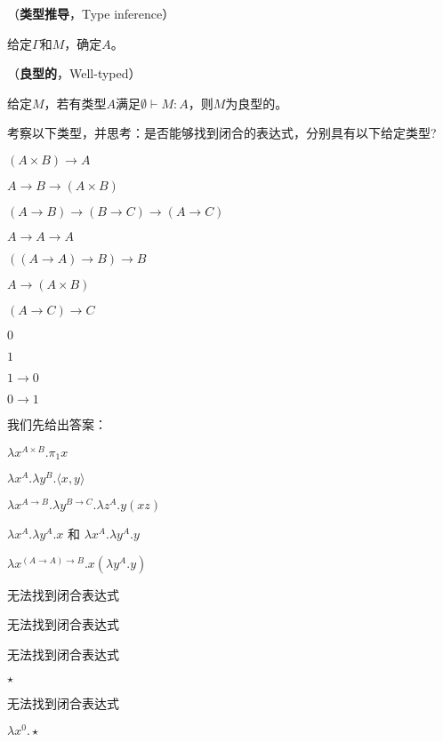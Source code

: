 \begin{defn}（\textbf{类型推导}，Type inference）

给定$\Gamma$和$M$，确定$A$。

\end{defn}

\begin{defn}（\textbf{良型的}，Well-typed）

给定$M$，若有类型$A$满足$\emptyset \vdash M : A$，则$M$为良型的。

\end{defn}

\begin{exmp}
考察以下类型，并思考：是否能够找到闭合的表达式，分别具有以下给定类型?

\begin{tightenum}

  \item $( A \times B) \to A$
  \item $A \to B \to (A \times B)$
  \item $(A \to B) \to (B \to C) \to (A \to C)$
  \item $A \to A \to A$
  \item $((A \to A) \to B) \to B$
  \item $A \to (A \times B)$
  \item $(A \to C) \to C$
  \item $0$
  \item $1$
  \item $1 \to 0$
  \item $0 \to 1$
\end{tightenum}

我们先给出答案：
\begin{tightenum}
  \item $\lambda x^{A \times B}.\pi_1 x$
  \item $\lambda x^A . \lambda y^B . \langle x, y \rangle$
  \item $\lambda x^{A \to B}. \lambda y^{B \to C} . \lambda z^A . y(xz)$
  \item $\lambda x^A . \lambda y^A . x$ 和 $\lambda x^A . \lambda y^A . y$
  \item $\lambda x^{(A \to A) \to B} . x(\lambda y^A . y)$
  \item 无法找到闭合表达式
  \item 无法找到闭合表达式
  \item 无法找到闭合表达式
  \item $\star$
  \item 无法找到闭合表达式
  \item $\lambda x^{0}. \star$
\end{tightenum}
\end{exmp}

